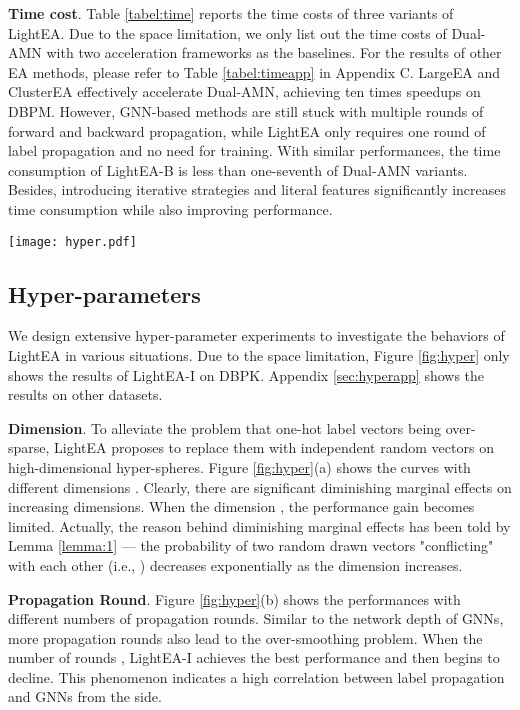 \documentclass[11pt]{article}
\begin{document}
\noindent
\textbf{Time cost}.
Table \ref{tabel:time} reports the time costs of three variants of LightEA.
Due to the space limitation, we only list out the time costs of Dual-AMN with two acceleration frameworks as the baselines.
For the results of other EA methods, please refer to Table \ref{tabel:timeapp} in Appendix C.
LargeEA and ClusterEA effectively accelerate Dual-AMN, achieving ten times speedups on DBPM.
However, GNN-based methods are still stuck with multiple rounds of forward and backward propagation, while LightEA only requires one round of label propagation and no need for training.
With similar performances, the time consumption of LightEA-B is less than one-seventh of Dual-AMN variants.
Besides, introducing iterative strategies and literal features significantly increases time consumption while also improving performance.

\begin{figure*}
    \centering
    \texttt{[image: hyper.pdf]}
    \caption{Hyper-parameter experiments of LightEA-I on DBPK.}
    \label{fig:hyper}
\end{figure*}

\subsection{Hyper-parameters}
We design extensive hyper-parameter experiments to investigate the behaviors of LightEA in various situations.
Due to the space limitation, Figure \ref{fig:hyper} only shows the results of LightEA-I on DBPK.
Appendix \ref{sec:hyperapp} shows the results on other datasets.

\noindent
\textbf{Dimension}.
To alleviate the problem that one-hot label vectors being over-sparse, LightEA proposes to replace them with independent random vectors on high-dimensional hyper-spheres.
Figure \ref{fig:hyper}(a) shows the  curves with different dimensions .
Clearly, there are significant diminishing marginal effects on increasing dimensions.
When the dimension , the performance gain becomes limited.
Actually, the reason behind diminishing marginal effects has been told by Lemma \ref{lemma:1} --- the probability of two random drawn vectors "conflicting" with each other (i.e., ) decreases exponentially as the dimension  increases.

\noindent
\textbf{Propagation Round}.
Figure \ref{fig:hyper}(b) shows the performances with different numbers of propagation rounds.
Similar to the network depth of GNNs, more propagation rounds also lead to the over-smoothing problem.
When the number of rounds , LightEA-I achieves the best performance and then begins to decline.
This phenomenon indicates a high correlation between label propagation and GNNs from the side.
\end{document}
